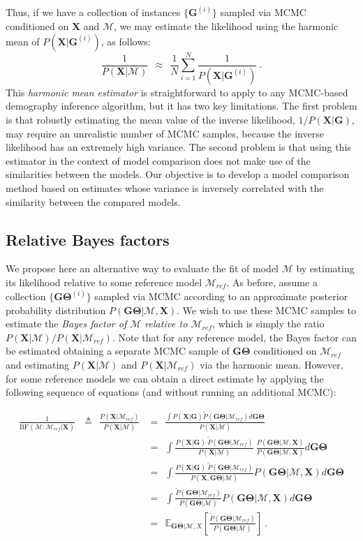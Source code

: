 \documentclass[11pt]{article}
\newcommand{\vect}[1]{\boldsymbol{\mathbf{#1}}}
\newcommand{\E}{\mathbb{E}}
\newcommand{\X}{\vect{X}}
\newcommand{\M}{\mathcal{M}}
\newcommand{\G}{\vect{G}}
\newcommand{\T}{\vect{\Theta}}
\newcommand{\GT}{\G\T}
\newcommand{\Mref}{\M_{ref}}
\newcommand{\Pref}{\widetilde{P}}
\newcommand{\rbf}{\text{BF}}
\begin{document}
Thus, if we have a collection of instances $\{\G^{(i)}\}$ sampled via MCMC conditioned on $\X$ and $\M$, we may
estimate the likelihood using the {harmonic mean} of $P(\X|\G^{(i)})$, as follows:
%
%
\begin{equation}\label{eq:harmonic}
 \frac{1}{P(\X|\M)} ~~\approx~~ \frac{1}{N} \sum_{i=1}^{N}\frac{1}{P(\X|\G^{(i)})} ~.
\end{equation}
%
%
This {\em harmonic mean estimator} is straightforward to apply to any MCMC-based demography
inference algorithm, but it has two key limitations.
%
The first problem is that robustly estimating the mean value of the inverse likelihood, $1/P(\X|\G)$,
may require an unrealistic number of MCMC samples, because the inverse likelihood has an extremely high variance.
%
The second problem is that using this estimator in the context of model comparison does not make use of the
similarities between the models.
%
Our objective is to develop a model comparison method based on estimates whose variance is inversely correlated with the
similarity between the compared models.

\subsection*{Relative Bayes factors}

We propose here an alternative way to evaluate the fit of model $\M$ by estimating its likelihood relative to some
reference model $\Mref$. 
%
As before, assume a collection $\{\GT^{(i)}\}$ sampled via MCMC according to an approximate posterior probability distribution $P(\GT|\M,\X)$.
%
We wish to use these MCMC samples to estimate the {\em Bayes factor of $\M$ relative to $\Mref$}, which is simply the ratio $P(\X|\M) / P(\X|\Mref)$.
%
Note that for any reference model, the Bayes factor can be estimated obtaining a separate MCMC sample of
$\GT$ conditioned on $\Mref$ and estimating $P(\X|\M)$ and $P(\X|\Mref)$ via the harmonic mean.
%
However, for some reference models we can obtain a direct estimate by applying the following sequence of equations (and without running an additional MCMC):
%
%
\begin{small}
\begin{align}
\frac{1}{\rbf(\M:\Mref|\X)} ~~~ \triangleq ~~ \frac{P(\X|\Mref)}{P(\X|\M)}
&=~~ \frac{\int P(\X|\G) \Pref(\GT|\Mref)d\GT}{P(\X|\M)} \label{eq:pref} \\ %
&=~~ \int \frac{P(\X|\G)\ \Pref(\GT|\Mref) }{P(\X|\M)} \ \frac{P(\GT|\M, \X)}{P(\GT|\M, \X)}  d\GT \label{eq:pref_nonzero} \\ %
&=~~ \int \frac{P(\X|\G)\ \Pref(\GT|\Mref) }{P(\X,\GT|\M)} P(\GT|\M, \X)  d\GT \label{eq:needlabel} \\ %
&=~~ \int \frac{\Pref(\GT|\Mref) }{P(\GT|\M)} P(\GT|\M, \X)  d\GT  \label{eq:data_cancel}\\ %
&=~~ \E_{\GT|\M,X } \left[\frac{\Pref(\GT|\Mref) }{P(\GT|\M)}\right]~.\label{eq:is_rbf}
\end{align}
\end{small}
\end{document}
